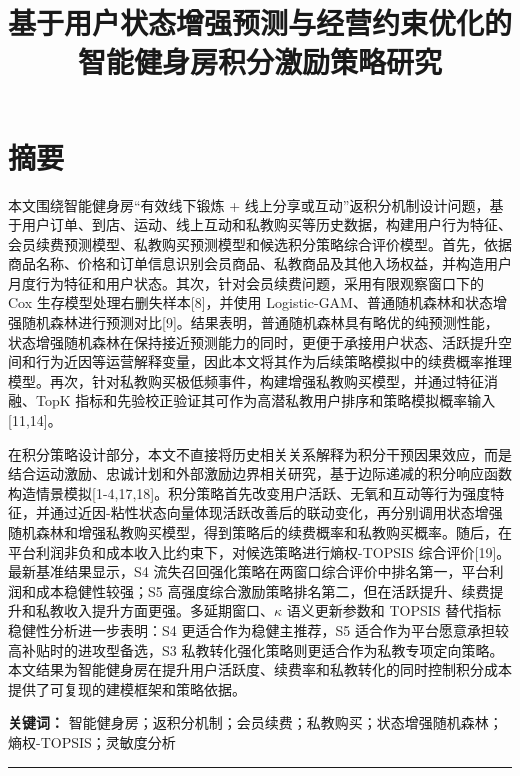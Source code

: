 \documentclass[
  12pt,
]{ctexart}
\title{基于用户状态增强预测与经营约束优化的智能健身房积分激励策略研究}
\author{}
\date{}
\begin{document}
\maketitle

\hypertarget{ux6458ux8981}{%
\section*{摘要}\label{ux6458ux8981}}

本文围绕智能健身房``有效线下锻炼 + 线上分享或互动''返积分机制设计问题，基于用户订单、到店、运动、线上互动和私教购买等历史数据，构建用户行为特征、会员续费预测模型、私教购买预测模型和候选积分策略综合评价模型。首先，依据商品名称、价格和订单信息识别会员商品、私教商品及其他入场权益，并构造用户月度行为特征和用户状态。其次，针对会员续费问题，采用有限观察窗口下的 Cox 生存模型处理右删失样本{[}8{]}，并使用 Logistic-GAM、普通随机森林和状态增强随机森林进行预测对比{[}9{]}。结果表明，普通随机森林具有略优的纯预测性能，状态增强随机森林在保持接近预测能力的同时，更便于承接用户状态、活跃提升空间和行为近因等运营解释变量，因此本文将其作为后续策略模拟中的续费概率推理模型。再次，针对私教购买极低频事件，构建增强私教购买模型，并通过特征消融、TopK 指标和先验校正验证其可作为高潜私教用户排序和策略模拟概率输入{[}11,14{]}。

在积分策略设计部分，本文不直接将历史相关关系解释为积分干预因果效应，而是结合运动激励、忠诚计划和外部激励边界相关研究，基于边际递减的积分响应函数构造情景模拟{[}1-4,17,18{]}。积分策略首先改变用户活跃、无氧和互动等行为强度特征，并通过近因-粘性状态向量体现活跃改善后的联动变化，再分别调用状态增强随机森林和增强私教购买模型，得到策略后的续费概率和私教购买概率。随后，在平台利润非负和成本收入比约束下，对候选策略进行熵权-TOPSIS 综合评价{[}19{]}。最新基准结果显示，S4 流失召回强化策略在两窗口综合评价中排名第一，平台利润和成本稳健性较强；S5 高强度综合激励策略排名第二，但在活跃提升、续费提升和私教收入提升方面更强。多延期窗口、\(\kappa\) 语义更新参数和 TOPSIS 替代指标稳健性分析进一步表明：S4 更适合作为稳健主推荐，S5 适合作为平台愿意承担较高补贴时的进攻型备选，S3 私教转化强化策略则更适合作为私教专项定向策略。本文结果为智能健身房在提升用户活跃度、续费率和私教转化的同时控制积分成本提供了可复现的建模框架和策略依据。

\textbf{关键词：} 智能健身房；返积分机制；会员续费；私教购买；状态增强随机森林；熵权-TOPSIS；灵敏度分析

\begin{center}\rule{0.5\linewidth}{0.5pt}\end{center}
\end{document}
